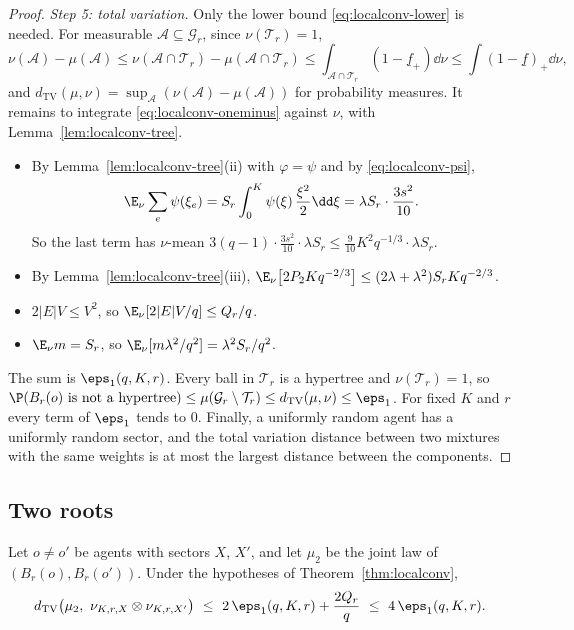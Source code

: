 \begin{proof}
\emph{Step 5: total variation.} Only the lower bound \eqref{eq:localconv-lower} is needed.
For measurable $\mathcal A\subseteq\mathcal G_r$, since $\nu(\mathcal T_r)=1$,
\[
\nu(\mathcal A)-\mu(\mathcal A)\le\nu(\mathcal A\cap\mathcal T_r)-\mu(\mathcal A\cap
\mathcal T_r)\le\int_{\mathcal A\cap\mathcal T_r}(1-\underline f_+)\dd\nu
\le\int(1-\underline f)_+\dd\nu ,
\]
and $d_{\mathrm{TV}}(\mu,\nu)=\sup_{\mathcal A}(\nu(\mathcal A)-\mu(\mathcal A))$ for
probability measures. It remains to integrate \eqref{eq:localconv-oneminus} against $\nu$,
with Lemma~\ref{lem:localconv-tree}.
\begin{itemize}
\item By Lemma~\ref{lem:localconv-tree}(ii) with $\varphi=\psi$ and by
\eqref{eq:localconv-psi},
\[
\E_\nu\sum_e\psi(\xi_e)=S_r\int_0^K\psi(\xi)\,\frac{\xi^2}2\dd\xi=\lambda S_r\cdot
\frac{3s^2}{10}.
\]
So the last term has $\nu$-mean
$3(q-1)\cdot\frac{3s^2}{10}\cdot\lambda S_r\le\frac9{10}K^2q^{-1/3}\cdot\lambda S_r$.
\item By Lemma~\ref{lem:localconv-tree}(iii),
$\E_\nu\bigl[2P_2Kq^{-2/3}\bigr]\le(2\lambda+\lambda^2)S_rKq^{-2/3}$.
\item $2|E|V\le V^2$, so $\E_\nu[2|E|V/q]\le Q_r/q$.
\item $\E_\nu m=S_r$, so $\E_\nu[m\lambda^2/q^2]=\lambda^2S_r/q^2$.
\end{itemize}
The sum is $\eps_1(q,K,r)$. Every ball in $\mathcal T_r$ is a hypertree and
$\nu(\mathcal T_r)=1$, so $\P(B_r(o)\text{ is not a hypertree})\le\mu(\mathcal G_r\setminus
\mathcal T_r)\le d_{\mathrm{TV}}(\mu,\nu)\le\eps_1$. For fixed $K$ and $r$ every term of
$\eps_1$ tends to $0$. Finally, a uniformly random agent has a uniformly random sector, and
the total variation distance between two mixtures with the same weights is at most the
largest distance between the components.
\end{proof}

\subsection{Two roots}\label{sec:localconv-two}

\begin{proposition}\label{prop:localconv-two}
Let $o\ne o'$ be agents with sectors $X$, $X'$, and let $\mu_2$ be the joint law of
$(B_r(o),B_r(o'))$. Under the hypotheses of Theorem~\ref{thm:localconv},
\[
d_{\mathrm{TV}}\bigl(\mu_2,\ \nu_{K,r,X}\otimes\nu_{K,r,X'}\bigr)\ \le\
2\,\eps_1(q,K,r)+\frac{2Q_r}{q}\ \le\ 4\,\eps_1(q,K,r).
\]
\end{proposition}

